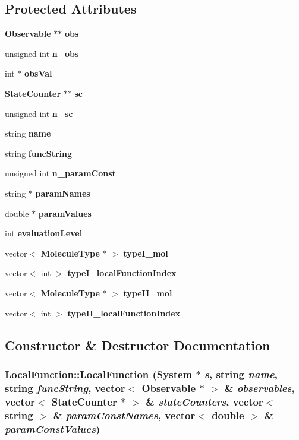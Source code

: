 \subsection*{Protected Attributes}
\begin{CompactItemize}
\item 
{\bf Observable} $\ast$$\ast$ {\bf obs}
\item 
unsigned int {\bf n\_\-obs}
\item 
int $\ast$ {\bf obsVal}
\item 
{\bf StateCounter} $\ast$$\ast$ {\bf sc}
\item 
unsigned int {\bf n\_\-sc}
\item 
string {\bf name}
\item 
string {\bf funcString}
\item 
unsigned int {\bf n\_\-paramConst}
\item 
string $\ast$ {\bf paramNames}
\item 
double $\ast$ {\bf paramValues}
\item 
int {\bf evaluationLevel}
\item 
vector$<$ {\bf MoleculeType} $\ast$ $>$ {\bf typeI\_\-mol}
\item 
vector$<$ int $>$ {\bf typeI\_\-localFunctionIndex}
\item 
vector$<$ {\bf MoleculeType} $\ast$ $>$ {\bf typeII\_\-mol}
\item 
vector$<$ int $>$ {\bf typeII\_\-localFunctionIndex}
\end{CompactItemize}


\subsection{Constructor \& Destructor Documentation}
\subsubsection{\setlength{\rightskip}{0pt plus 5cm}LocalFunction::LocalFunction ({\bf System} $\ast$ {\em s}, string {\em name}, string {\em funcString}, vector$<$ {\bf Observable} $\ast$ $>$ \& {\em observables}, vector$<$ {\bf StateCounter} $\ast$ $>$ \& {\em stateCounters}, vector$<$ string $>$ \& {\em paramConstNames}, vector$<$ double $>$ \& {\em paramConstValues})}\label{classNFcore_1_1LocalFunction_7956d0bfe43e8b5bdb9e537039083ba5}


